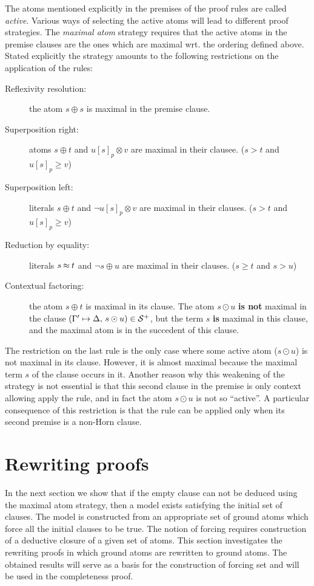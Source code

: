 The atoms mentioned explicitly in the premises of the proof rules are called
{\em active}. Various ways of selecting the active atoms will lead to 
different proof strategies. The {\em maximal atom} strategy 
requires that the active atoms in the premise clauses are the ones
which are maximal wrt. the ordering defined above. 
Stated explicitly the strategy amounts
to the following restrictions on the application of the rules:
\begin{description}
\item[Reflexivity resolution:] the atom \(s\oplus s\) is maximal 
in the premise clause.
\item [Superposition right:] atoms \(s\oplus t\) and \(u[s]_p\otimes v\) 
are maximal in their clausee. 
       ($s>t$ and \(u[s]_p\geq v\))
\item [Superposition left:] literals \(s\oplus t\) and \(\neg 
 u[s]_p\otimes v\) are maximal in their clauses.
        ($s>t$ and \(u[s]_p\geq v\))
\item [Reduction by equality:] literals \(s\mathbin{\approx} t\) and \(\neg s\oplus u\) 
are maximal in their clauses. 
        (\(s\geq t\) and $s>u$)
\item [Contextual factoring:] the atom \(s\oplus t\) is maximal 
in its clause. The atom \(s\odot u\) {\bf is not} maximal in 
the clause \((\Gamma' \mathrel{\mapsto} \Delta, \, s\odot u) \in{\cal S}^{+}\), 
but the term $s$ {\bf is} maximal in this clause, 
and the maximal atom is in the succedent of this clause.
\end{description}

The restriction on the last rule is the only case where some active atom
($s\odot u$) is not maximal in its clause. However, it is almost
maximal because the maximal term $s$ of the clause occurs in it.  Another
reason why this weakening of the strategy is not essential is that this second
clause in the premise is only context allowing apply the rule, and in fact the
atom $s\odot u$ is not so ``active''. 
A particular consequence of this restriction is that the rule can be applied only
when its second premise is a non-Horn clause.


\section{Rewriting proofs} \label{se:rewrite}

In the next section we show that if the empty clause can not be
deduced using the maximal atom strategy,
 then a model exists satisfying the initial set of clauses. 
The model is constructed from an appropriate set of ground atoms which
force all the initial clauses to be true.
The notion of forcing requires construction of a deductive closure of a
given set of atoms.
This section investigates the rewriting proofs in which ground atoms 
are rewritten to ground atoms. The obtained results 
will serve as a basis for the construction of forcing set and will be
used in the completeness proof.

